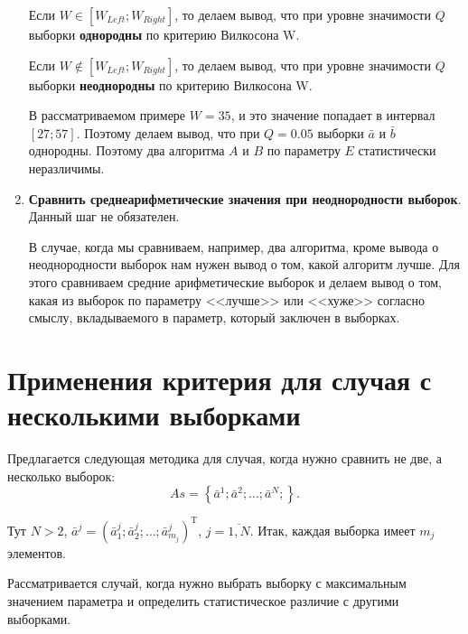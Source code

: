 \documentclass[a4paper,12pt]{article}
\begin{document}
\begin{enumerate}
Если $W \in \left[ W_{Left}; W_{Right}\right] $, то делаем вывод, что при уровне значимости $Q$ выборки \textbf{однородны} по критерию Вилкосона W.

Если $W \notin \left[ W_{Left}; W_{Right}\right] $, то делаем вывод, что при уровне значимости $Q$ выборки \textbf{неоднородны} по критерию Вилкосона W.

В рассматриваемом примере $W=35$, и это значение попадает в интервал  $\left[ 27; 57\right] $. Поэтому делаем вывод, что при $ Q=0.05 $ выборки $ \bar{a} $ и $ \bar{b} $ однородны. Поэтому два алгоритма $A$ и $B$ по параметру $E$ статистически неразличимы.

\item \textbf{Сравнить среднеарифметические значения при неоднородности выборок}. Данный шаг не обязателен.

В случае, когда мы сравниваем, например, два алгоритма, кроме вывода о неоднородности выборок нам нужен вывод о том, какой алгоритм лучше. Для этого сравниваем средние арифметические выборок и делаем вывод о том, какая из выборок по параметру <<лучше>> или <<хуже>> согласно смыслу, вкладываемого в параметр, который заключен в выборках.

\end{enumerate}

\section{Применения критерия для случая с несколькими выборками}\label{WilcoxonW:section_samples}

Предлагается следующая методика для случая, когда нужно сравнить не две, а несколько выборок:
\begin{equation}
As = \left\lbrace \bar{a}^1; \bar{a}^2; \ldots; \bar{a}^N; \right\rbrace.
\end{equation}

Тут $ N>2 $, $ \bar{a}^j=\left(\bar{a}^j_1 ;\bar{a}^j_2;\ldots;\bar{a}^j_{m_j} \right)^\mathrm{T} $, $ j=\overline{1,N}$. Итак, каждая выборка имеет $ m_j $ элементов.

Рассматривается случай, когда нужно выбрать выборку с максимальным значением параметра и определить статистическое различие с другими выборками.
\end{document}
